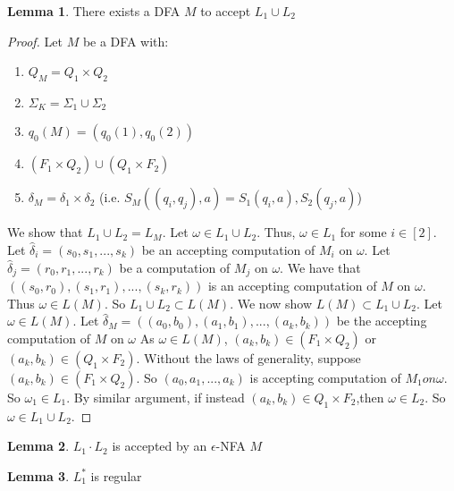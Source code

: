 \documentclass{article}
\theoremstyle{definition}
\newtheorem{lemma}{Lemma}[section]
\begin{document}
\begin{lemma}
There exists a DFA $M$ to accept $L_1 \cup L_2$
\end{lemma}
\begin{proof}
Let $M$ be a DFA with:
	\begin{enumerate}
		\item $Q_M=Q_1 \times Q_2$
		\item $\Sigma_K = \Sigma_1 \cup \Sigma_2$
		\item $q_0(M)=(q_0(1),q_0(2))$
		\item $(F_1 \times Q_2)\cup (Q_1 \times F_2)$
		\item $\delta_M = \delta_1 \times \delta_2$ (i.e. $S_M((q_i,q_j),a)=S_1(q_i,a),S_2(q_j,a)$)
	\end{enumerate} 
We show that $L_1 \cup L_2 = L_M$. Let $\omega \in L_1\cup L_2$. Thus, $\omega \in L_1$ for some $i\in [2]$. Let $\hat{\delta}_i=(s_0,s_1,...,s_k)$ be an accepting computation of $M_i$ on $\omega$. Let $\hat{\delta}_j=(r_0,r_1,...,r_k)$ be a computation of $M_j$ on $\omega$. We have that $((s_0,r_0),(s_1,r_1),...,(s_k,r_k))$ is an accepting computation of $M$ on $\omega$. Thus $\omega \in L(M)$. So $L_1\cup L_2 \subset L(M)$. We now show $L(M)\subset L_1\cup L_2$. Let $\omega \in L(M)$. Let $\hat{\delta}_M =((a_0,b_0),(a_1,b_1),...,(a_k,b_k))$ be the accepting computation of $M$ on $\omega$ As $\omega \in L(M)$, $(a_k,b_k)\in(F_1\times Q_2)$ or $(a_k,b_k)\in (Q_1\times F_2)$. Without the laws of generality, suppose $(a_k,b_k)\in(F_1\times Q_2)$. So $(a_0,a_1,...,a_k)$ is accepting computation of $M_1 on \omega$. So $\omega_1\in L_1$. By similar argument, if instead $(a_k,b_k)\in Q_1 \times F_2$,then $\omega \in L_2$. So $\omega \in L_1\cup L_2$.
\end{proof}

\begin{lemma}
$L_1\cdot L_2$ is accepted by an $\epsilon$-NFA $M$
\end{lemma}

\begin{lemma}
$L_1^*$ is regular
\end{lemma}
\end{document}
